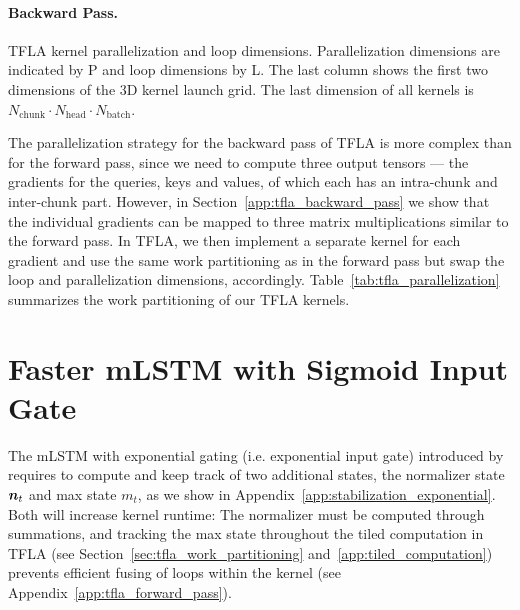 \documentclass{article}
\begin{document}
\paragraph{Backward Pass.}
\begin{table}
    \vspace{-0.45cm}
    \centering
    \caption{\label{tab:tfla_parallelization} TFLA kernel parallelization and loop dimensions. Parallelization dimensions are indicated by P and loop dimensions by L. The last column shows the first two dimensions of the 3D kernel launch grid. The last dimension of all kernels is $N_\text{chunk} \cdot N_\text{head} \cdot N_\text{batch}$.}
    \vspace{-0.1cm}
    \begin{adjustbox}{width=\linewidth}    
    
    \end{adjustbox}
    \vspace{-0.5cm}
\end{table}
The parallelization strategy for the backward pass of TFLA is more complex than for the forward pass, since we need to compute three output tensors --- the gradients for the queries, keys and values, of which each has an intra-chunk and inter-chunk part.
However, in Section~\ref{app:tfla_backward_pass} we show that the individual gradients can be mapped to three matrix multiplications similar to the forward pass.
In TFLA, we then implement a separate kernel for each gradient and use the same work partitioning as in the forward pass but swap the loop and parallelization dimensions, accordingly.
Table~\ref{tab:tfla_parallelization} summarizes the work partitioning of our TFLA kernels.
\vspace{-0.4cm}
\section{Faster mLSTM with Sigmoid Input Gate}
\label{sec:mlstmsig}
\vspace{-0.2cm}
The mLSTM with exponential gating (i.e. exponential input gate) introduced by~\citet{beck:24xlstm} requires to compute and keep track of two additional states, the normalizer state $\bm{n}_t$ and max state $m_t$, as we show in Appendix~\ref{app:stabilization_exponential}.
Both will increase kernel runtime:
The normalizer must be computed through summations, and tracking the max state throughout the tiled computation in TFLA (see Section~\ref{sec:tfla_work_partitioning} and~\ref{app:tiled_computation}) prevents efficient fusing of loops within the kernel (see Appendix~\ref{app:tfla_forward_pass}).
\end{document}
